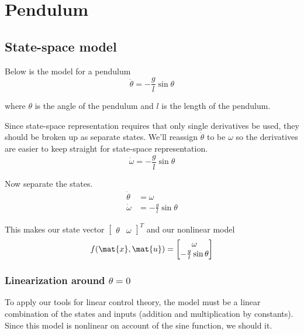 \section{Pendulum}

\subsection{State-space model}

Below is the \gls{model} for a pendulum
\begin{equation*}
  \ddot{\theta} = -\frac{g}{l}\sin\theta
\end{equation*}

where $\theta$ is the angle of the pendulum and $l$ is the length of the
pendulum.

Since state-space representation requires that only single derivatives be used,
they should be broken up as separate \glspl{state}. We'll reassign
$\dot{\theta}$ to be $\omega$ so the derivatives are easier to keep straight for
state-space representation.
\begin{equation*}
  \dot{\omega} = -\frac{g}{l}\sin\theta
\end{equation*}

Now separate the \glspl{state}.
\begin{align*}
  \dot{\theta} &= \omega \\
  \dot{\omega} &= -\frac{g}{l} \sin\theta
\end{align*}

This makes our state vector $\begin{bmatrix}\theta & \omega\end{bmatrix}^T$ and
our nonlinear model
\begin{equation*}
  f(\mat{x}, \mat{u}) =
  \begin{bmatrix}
    \omega \\
    -\frac{g}{l}\sin\theta
  \end{bmatrix}
\end{equation*}

\subsubsection{Linearization around $\theta = 0$}

To apply our tools for linear control theory, the \gls{model} must be a linear
combination of the \glspl{state} and \glspl{input} (addition and multiplication
by constants). Since this \gls{model} is nonlinear on account of the sine
function, we should 
 it.

